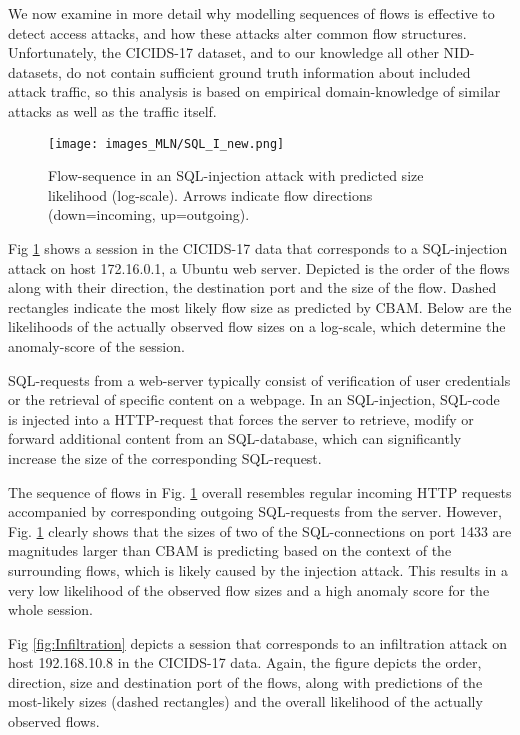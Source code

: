 We now examine in more detail why modelling sequences of flows is effective to detect access attacks, and how these attacks alter common flow structures. Unfortunately, the CICIDS-17 dataset, and to our knowledge all other NID-datasets, do not contain sufficient ground truth information about included attack traffic, so this analysis is based on empirical domain-knowledge of similar attacks as well as the traffic itself.

\begin{figure}[ht]
    \begin{center}
      \texttt{[image: images\_MLN/SQL\_I\_new.png]}
    \end{center}
    \caption{Flow-sequence in an SQL-injection attack with predicted size likelihood (log-scale). Arrows indicate flow directions (down=incoming, up=outgoing).}\label{fig:SQL_I}
\end{figure}


Fig \ref{fig:SQL_I} shows a session in the CICIDS-17 data that corresponds to a SQL-injection attack on host 172.16.0.1, a Ubuntu web server. Depicted is the order of the flows along with their direction, the destination port and the size of the flow. Dashed rectangles indicate the most likely flow size as predicted by CBAM. Below are the likelihoods of the actually observed flow sizes on a log-scale, which determine the anomaly-score of the session.

SQL-requests from a web-server typically consist of verification of user credentials or the retrieval of specific content on a webpage.
In an SQL-injection, SQL-code is injected into a HTTP-request that forces the server to retrieve, modify or forward additional content from an SQL-database, which can significantly increase the size of the corresponding SQL-request. 

The sequence of flows in Fig. \ref{fig:SQL_I} overall resembles regular incoming HTTP requests accompanied by corresponding outgoing SQL-requests from the server. However, 
Fig. \ref{fig:SQL_I} clearly shows that the sizes of two of the SQL-connections on port 1433 are magnitudes larger than CBAM is predicting based on the context of the surrounding flows, which is likely caused by the injection attack. This results in a very low likelihood of the observed flow sizes and a high anomaly score for the whole session.


Fig \ref{fig:Infiltration} depicts a session that corresponds to an infiltration attack on host 192.168.10.8 in the CICIDS-17 data. Again, the figure depicts the order, direction, size and destination port of the flows, along with predictions of the most-likely sizes (dashed rectangles) and the overall likelihood of the actually observed flows.


